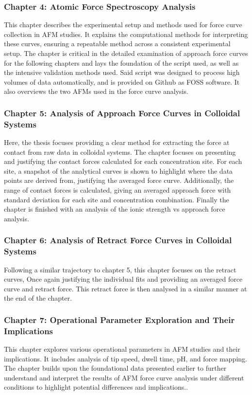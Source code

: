 \subsubsection{Chapter 4: Atomic Force Spectroscopy Analysis}
This chapter describes the experimental setup and methods used for force curve collection in AFM studies. It explains the computational methods for interpreting these curves, ensuring a repeatable method across a consistent experimental setup. The chapter is critical in the detailed examination of approach force curves for the following chapters and lays the foundation of the script used, as well as the intensive validation methods used. Said script was designed to process high volumes of data automatically, and is provided on Github as FOSS software. It also overviews the two AFMs used in the force curve analysis. 

\subsubsection{Chapter 5: Analysis of Approach Force Curves in Colloidal Systems}
Here, the thesis focuses providing a clear method for extracting the force at contact from raw data in colloidal systems. The chapter focuses on presenting and justifying the contact forces calculated for each concentration site. For each site, a snapshot of the analytical curves is shown to highlight where the data points are derived from, justifying the averaged force curve. Additionally, the range of contact forces is calculated, giving an averaged approach force with standard deviation for each site and concentration combination. Finally the chapter is finished with an analysis of the ionic strength vs approach force analysis.

\subsubsection{Chapter 6: Analysis of Retract Force Curves in Colloidal Systems}
Following a similar trajectory to chapter 5, this chapter focuses on the retract curves, Once again justifying the individual fits and providing an averaged force curve and retract force. This retract force is then analysed in a similar manner at the end of the chapter.

\subsubsection{Chapter 7: Operational Parameter Exploration and Their Implications}
This chapter explores various operational parameters in AFM studies and their implications. It includes analysis of tip speed, dwell time, pH, and force mapping. The chapter builds upon the foundational data presented earlier to further understand and interpret the results of AFM force curve analysis under different conditions to highlight potential differences and implications..

